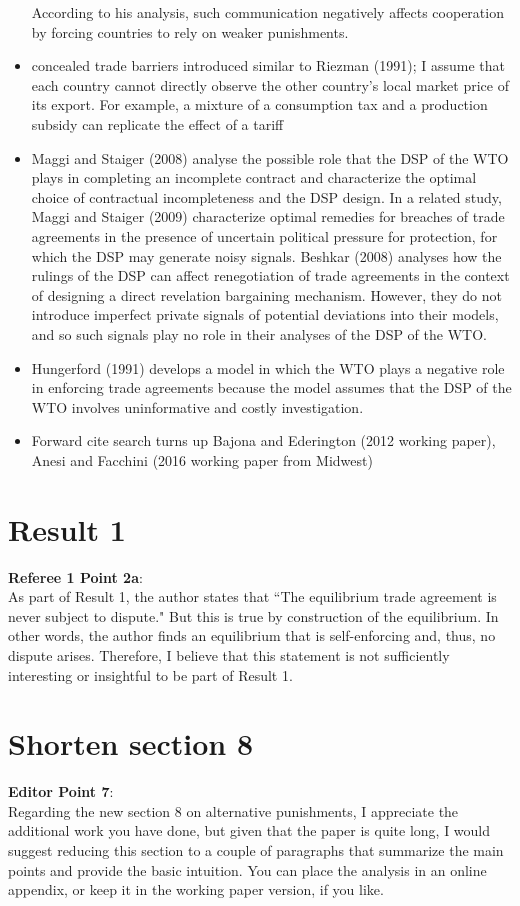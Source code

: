 \documentclass[12pt]{article}
\begin{document}
\begin{itemize}
According to his analysis, such communication negatively affects cooperation by forcing countries to rely on weaker
punishments.
	\item concealed trade barriers introduced similar to Riezman (1991); I assume that each country cannot directly observe the other country’s local market price of its export. For example, a mixture of a consumption tax and a production subsidy can replicate the effect of a tariff
	\item Maggi and Staiger (2008) analyse the possible role that the DSP of the WTO plays in completing an incomplete
contract and characterize the optimal choice of contractual incompleteness and the DSP design. In a related study, Maggi
and Staiger (2009) characterize optimal remedies for breaches of trade agreements in the presence of uncertain political
pressure for protection, for which the DSP may generate noisy signals. Beshkar (2008) analyses how the rulings of the
DSP can affect renegotiation of trade agreements in the context of designing a direct revelation bargaining mechanism.
However, they do not introduce imperfect private signals of potential deviations into their models, and so such signals
play no role in their analyses of the DSP of the WTO.
	\item Hungerford (1991) develops a model in which the WTO plays a negative role in enforcing trade agreements
because the model assumes that the DSP of the WTO involves uninformative and costly investigation.
	\item Forward cite search turns up Bajona and Ederington (2012 working paper), Anesi and Facchini (2016 working paper from Midwest)
\end{itemize}

\newpage
\section{Result 1}
\textbf{Referee 1 Point 2a}: \\
As part of Result 1, the author states that ``The equilibrium trade agreement is never subject to dispute." But this is true by construction of the equilibrium. In other words, the author finds an equilibrium that is self-enforcing and, thus, no dispute arises. Therefore, I believe that this statement is not sufficiently interesting or insightful to be part of Result 1. \\

\newpage
\section{Shorten section 8}
\textbf{Editor Point 7}:\\
Regarding the new section 8 on alternative punishments, I appreciate the additional work you have done, but given that the paper is quite long, I would suggest reducing this section to a couple of paragraphs that summarize the main points and provide the basic intuition. You can place the analysis in an online appendix, or keep it in the working paper version, if you like. \\
\end{document}
